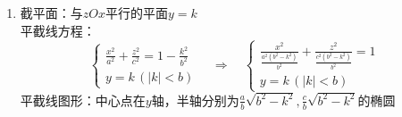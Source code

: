 \begin{enumerate}
\begin{enumerate}
	\item 截平面：与$zOx$平行的平面$ y = k $\\
	\kg 平截线方程：
	\begin{equation*}
	\begin{cases}
	\displaystyle \frac{x^2}{a^2} + \frac{z^2}{c^2}=1- \frac{k^2}{b^2}\\
	y=k \, (|k|<b)
	\end{cases}
	\quad \Longrightarrow \quad 
		\begin{cases}
	\displaystyle \frac{x^2}{\frac{a^2(b^2-k^2)}{b^2}} + \frac{z^2}{\frac{c^2(b^2-k^2)}{b^2}}=1\\
	y=k \, (|k|<b)
	\end{cases}
	\end{equation*}
	\kg 平截线图形：中心点在$y$轴，半轴分别为$\displaystyle \frac{a}{b}\sqrt{b^2-k^2},\frac{c}{b}\sqrt{b^2-k^2}$的椭圆
\end{enumerate}

\end{enumerate}

